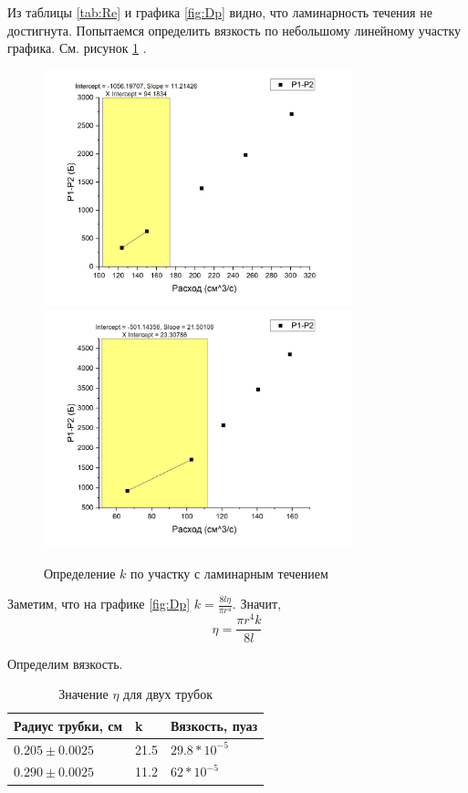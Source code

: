 \documentclass[a4paper]{article}
\begin{document}
Из таблицы \ref{tab:Re} и графика \ref{fig:Dp} видно, что ламинарность течения не достигнута. Попытаемся определить вязкость по небольшому линейному участку графика. См. рисунок 
\ref{fig:4} .
\begin{figure}
	\centering
		\includegraphics[width=0.80\textwidth]{4.jpg}
		\includegraphics[width=0.80\textwidth]{5.jpg}
	\label{fig:4}
	\caption{Определение $k$ по участку с ламинарным течением}
\end{figure}

Заметим, что на графике \ref{fig:Dp} $k = \frac{8 l \eta}{\pi r^4}$. Значит, 
\begin{equation}
\eta = \frac{\pi r^4 k}{8 l}
\label{eq:Et}
\end{equation}

Определим вязкость.
\begin{table}[htpb]
	\centering
\begin{tabular}{|l|l|l|}
\hline
\textbf{Радиус трубки, см} & \textbf{k} & \textbf{Вязкость, пуаз} \\ \hline
$0.205 \pm 0.0025$               & 21.5       & $29.8*10^{-5}$                \\ \hline
$0.290 \pm 0.0025$               & 11.2       & $62*10^{-5}$               \\ \hline
\end{tabular}
	\caption{Значение $\eta$ для двух трубок}
	\label{tab:Kk}
\end{table}
\end{document}
